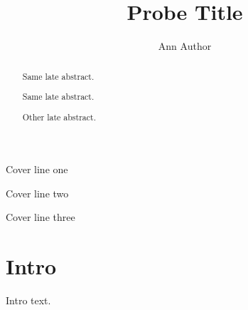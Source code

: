 \documentclass{article}
\title{Probe Title}\author{Ann Author}
\begin{document}
\maketitle
\begin{center}Cover line one\end{center}
\begin{abstract}Same late abstract.\end{abstract}
\begin{center}Cover line two\end{center}
\begin{abstract}Same late abstract.\end{abstract}
\begin{center}Cover line three\end{center}
\begin{abstract}Other late abstract.\end{abstract}
\section{Intro}
Intro text.
\end{document}
